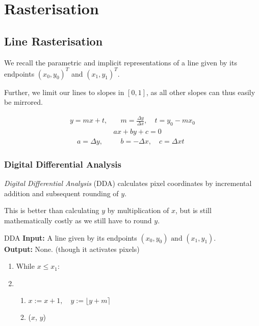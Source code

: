 \documentclass{panikzettel}
\begin{document}
\section{Rasterisation}

\subsection{Line Rasterisation}

\begin{halfboxl}
We recall the parametric and implicit representations of a line given by its endpoints $(x_0,y_0)^T$ and $(x_1,y_1)^T$.

Further, we limit our lines to slopes in $[0,1]$, as all other slopes can thus easily be mirrored.

\end{halfboxl}%
\begin{halfboxr}
\vspace{-\baselineskip}
\begin{align*}
    y = mx + t, & \quad m = \frac{\Delta y}{\Delta x}, \quad t = y_0 - mx_0  \\
    & ax + by + c = 0 \\
    \quad a = \Delta y, & \quad b =-\Delta x, \quad c = \Delta x t
\end{align*}
\end{halfboxr}


\begin{halfboxl}
\vspace{-\baselineskip}
\subsubsection*{Digital Differential Analysis}

\emph{Digital Differential Analysis} (DDA) calculates pixel coordinates by incremental addition and subsequent rounding of $y$.

This is better than calculating $y$ by multiplication of $x$, but is still mathematically costly as we still have to round $y$.
\end{halfboxl}%
\begin{halfboxr}
\vspace{-\baselineskip}
\begin{algo}{DDA}
\textbf{Input:} A line given by its endpoints $(x_0,y_0) \text{ and } (x_1,y_1)$. \\
\textbf{Output:} None. (though it activates pixels)
\tcblower
\begin{enumerate}
    \item While $x \le x_1$:
    \item   \begin{enumerate}
                \item $x := x + 1, \quad y := \lfloor y + m \rceil$
                \item {}($x$, $y$)
            \end{enumerate}
\end{enumerate}
\end{algo}
\end{halfboxr}
\end{document}
